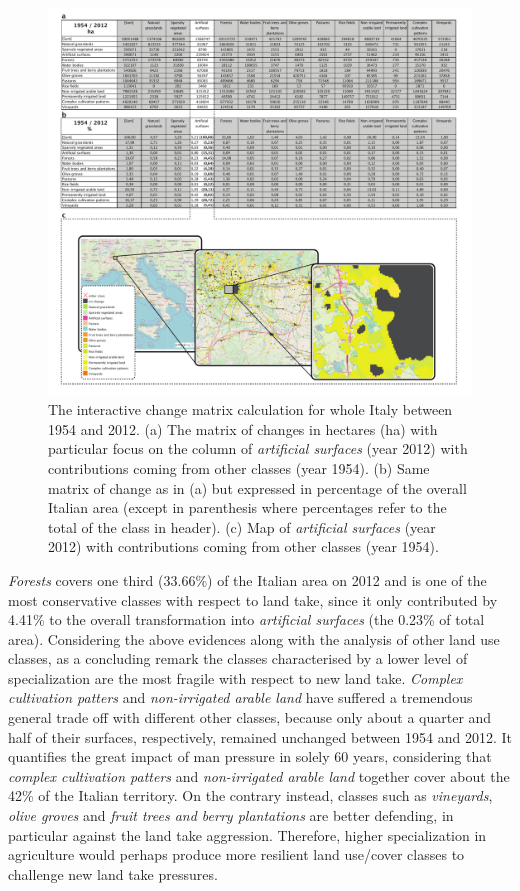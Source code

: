 \documentclass[APA,LATO1COL,doublespace]{WileyNJD-v2}
\begin{document}
\begin{figure}[t] %
    \centerline{\includegraphics[width=450pt]{04_caso_nazionale.pdf}}
    \caption{ The interactive change matrix calculation for whole Italy between 1954 and 2012.
    (a) The matrix of changes in hectares (ha) with particular focus on the column of \textit{artificial surfaces} (year 2012) with contributions coming from other classes (year 1954).
    (b) Same matrix of change as in (a) but expressed in percentage of the overall Italian area (except in parenthesis where percentages refer to the total of the class in header).
    (c) Map of \textit{artificial surfaces} (year 2012) with contributions coming from other classes (year 1954).
    } \label{fig:caseIT}
\end{figure}

\textit{Forests} covers one third (33.66\%) of the Italian area on 2012 and is one of the most conservative classes with respect to land take, since it only contributed by 4.41\% to the overall transformation into \textit{artificial surfaces} (the 0.23\% of total area).
Considering the above evidences along with the analysis of other land use classes, as a concluding remark the classes characterised by a lower level of specialization are the most fragile with respect to new land take.
\textit{Complex cultivation patters} and \textit{non-irrigated arable land} have suffered a tremendous general trade off with different other classes, because only about a quarter and half of their surfaces, respectively, remained unchanged between 1954 and 2012.
It quantifies the great impact of man pressure in solely 60 years, considering that \textit{complex cultivation patters} and \textit{non-irrigated arable land} together cover about the 42\% of the Italian territory.
On the contrary instead, classes such as \textit{vineyards}, \textit{olive groves} and \textit{fruit trees and berry plantations} are better defending, in particular against the land take aggression.
Therefore, higher specialization in agriculture would perhaps produce more resilient land use/cover classes to challenge new land take pressures.
\end{document}
